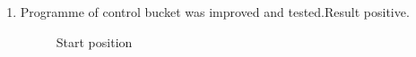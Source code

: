 \begin{enumerate}
\begin{enumerate}
        \item Programme of control bucket was improved and tested.Result positive.
        \begin{figure}[H]
	  	  \begin{minipage}[h]{0.31\linewidth}
	  	    \caption{Start position}
	  	  \end{minipage}
	  	  \hfill
	  	  \begin{minipage}[h]{0.31\linewidth}

\end{minipage}
\end{figure}
\end{enumerate}
\end{enumerate}
